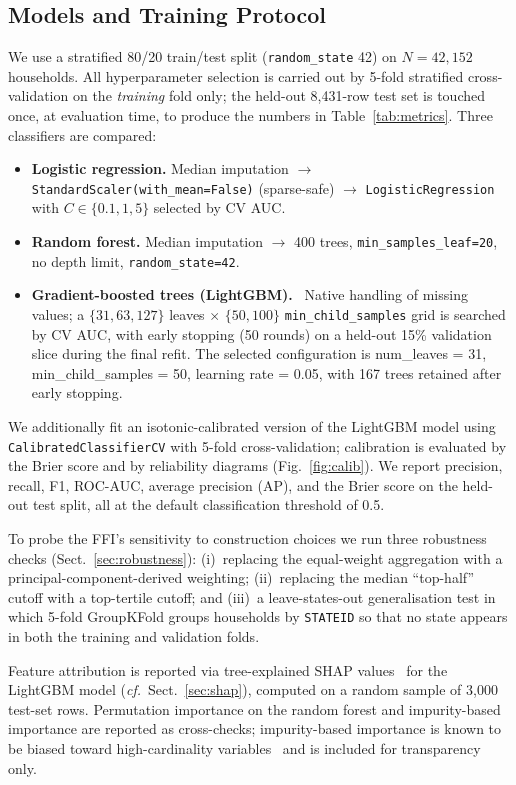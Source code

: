\documentclass[colorlinks,balance]{asmeconf}
\begin{document}
\subsection{Models and Training Protocol}
We use a stratified 80/20 train/test split (\texttt{random\_state} 42) on $N = 42{,}152$ households. All hyperparameter selection is carried out by 5-fold stratified cross-validation on the \emph{training} fold only; the held-out 8{,}431-row test set is touched once, at evaluation time, to produce the numbers in Table~\ref{tab:metrics}. Three classifiers are compared:
\begin{itemize}
\item \textbf{Logistic regression.} Median imputation $\to$ \texttt{StandardScaler(with\_mean=False)} (sparse-safe) $\to$ \texttt{LogisticRegression} with $C \in \{0.1, 1, 5\}$ selected by CV AUC.
\item \textbf{Random forest.} Median imputation $\to$ 400 trees, \texttt{min\_samples\_leaf=20}, no depth limit, \texttt{random\_state=42}.
\item \textbf{Gradient-boosted trees (LightGBM).}~\cite{ke2017lightgbm} Native handling of missing values; a $\{31, 63, 127\}$ leaves $\times$ $\{50, 100\}$ \texttt{min\_child\_samples} grid is searched by CV AUC, with early stopping (50 rounds) on a held-out 15\% validation slice during the final refit. The selected configuration is num\_leaves = 31, min\_child\_samples = 50, learning rate = 0.05, with 167 trees retained after early stopping.
\end{itemize}
We additionally fit an isotonic-calibrated version of the LightGBM model using \texttt{CalibratedClassifierCV} with 5-fold cross-validation; calibration is evaluated by the Brier score and by reliability diagrams (Fig.~\ref{fig:calib}). We report precision, recall, F1, ROC-AUC, average precision (AP), and the Brier score on the held-out test split, all at the default classification threshold of 0.5.

To probe the FFI's sensitivity to construction choices we run three robustness checks (Sect.~\ref{sec:robustness}): (i)~replacing the equal-weight aggregation with a principal-component-derived weighting; (ii)~replacing the median ``top-half'' cutoff with a top-tertile cutoff; and (iii)~a leave-states-out generalisation test in which 5-fold GroupKFold groups households by \texttt{STATEID} so that no state appears in both the training and validation folds.

Feature attribution is reported via tree-explained SHAP values~\cite{lundberg2017shap} for the LightGBM model (\emph{cf.}\ Sect.~\ref{sec:shap}), computed on a random sample of 3{,}000 test-set rows. Permutation importance on the random forest and impurity-based importance are reported as cross-checks; impurity-based importance is known to be biased toward high-cardinality variables~\cite{strobl2007bias} and is included for transparency only.
\end{document}
